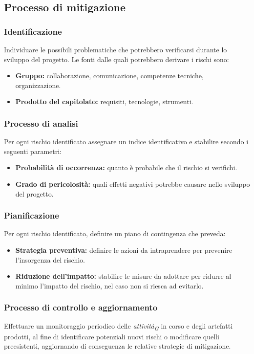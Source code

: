 \subsection{Processo di mitigazione}
\subsubsection{Identificazione}
    Individuare le possibili problematiche che potrebbero verificarsi durante lo sviluppo del progetto. 
    Le fonti dalle quali potrebbero derivare i rischi sono: 
    \begin{itemize}
        \item \textbf{Gruppo:} collaborazione, comunicazione, competenze tecniche, organizzazione.
        \item \textbf{Prodotto del capitolato:} requisiti, tecnologie, strumenti.
    \end{itemize}

\subsubsection{Processo di analisi}
Per ogni rischio identificato assegnare un indice identificativo e stabilire secondo i seguenti parametri:
\begin{itemize}
    \item \textbf{Probabilità di occorrenza:} quanto è probabile che il rischio si verifichi.
    \item \textbf{Grado di pericolosità:} quali effetti negativi potrebbe causare nello sviluppo del progetto.
\end{itemize}

\subsubsection{Pianificazione}
Per ogni rischio identificato, definire un piano di contingenza che preveda:
\begin{itemize}
    \item \textbf{Strategia preventiva:} definire le azioni da intraprendere per prevenire l’insorgenza del rischio.
    \item \textbf{Riduzione dell'impatto:} stabilire le misure da adottare per ridurre al minimo l'impatto del rischio, nel caso non si riesca ad evitarlo.
\end{itemize}

\subsubsection{Processo di controllo e aggiornamento}
Effettuare un monitoraggio periodico delle \textit{attività}\textsubscript{\textit{G}} in corso e degli artefatti prodotti, al fine di identificare potenziali nuovi rischi o modificare quelli preesistenti, aggiornando di conseguenza le relative strategie di mitigazione.

